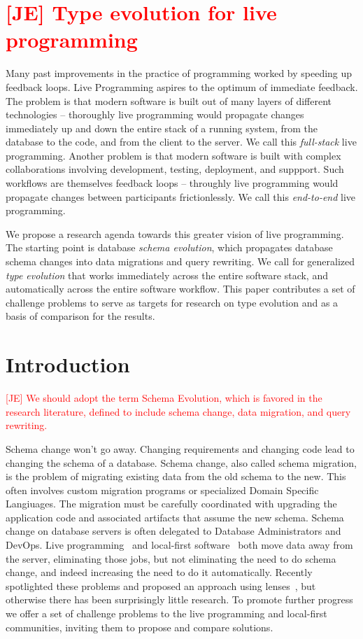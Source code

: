 \documentclass[english,submission]{programming}
\begin{document}
\section{\textcolor{red}{[JE] Type evolution for live programming}}

Many past improvements in the practice of programming worked by speeding up feedback loops. Live Programming aspires to the optimum of immediate feedback. The problem is that modern software is built out of many layers of different technologies -- thoroughly live programming would propagate changes immediately up and down the entire stack of a running system, from the database to the code, and from the client to the server. We call this \textit{full-stack} live programming. Another problem is that modern software is built with complex collaborations involving development, testing, deployment, and suppport. Such workflows are themselves feedback loops -- throughly live programming would propagate changes between participants frictionlessly. We call this \textit{end-to-end} live programming.

We propose a research agenda towards this greater vision of live programming. The starting point is database \textit{schema evolution}, which propagates database schema changes into data migrations and query rewriting. We call for generalized \textit{type evolution} that works immediately across the entire software stack, and automatically across the entire software workflow. This paper contributes a set of challenge problems to serve as targets for research on type evolution and as a basis of comparison for the results.


\section{Introduction}

\textcolor{red}{[JE] We should adopt the term Schema Evolution, which is favored in the research literature, defined to include schema change, data migration, and query rewriting. }

Schema change won't go away. Changing requirements and changing code lead to changing the schema of a database. Schema change, also called schema migration, is the problem of migrating existing data from the old schema to the new. This often involves custom migration programs or specialized Domain Specific Langiuages. The migration must be carefully coordinated with upgrading the application code and associated artifacts that assume the new schema. Schema change on database servers is often delegated to Database Administrators and DevOps. Live programming~\cite{tanimoto90,Hancock03} and local-first software~\cite{localfirst} both move data away from the server, eliminating those jobs, but not eliminating the need to do schema change, and indeed increasing the need to do it automatically. Recently \citet{Cambria} spotlighted these problems and proposed an approach using lenses~\cite{Foster2007}, but otherwise there has been surprisingly little research. To promote further progress we offer a set of challenge problems to the live programming and local-first communities, inviting them to propose and compare solutions.
\end{document}
